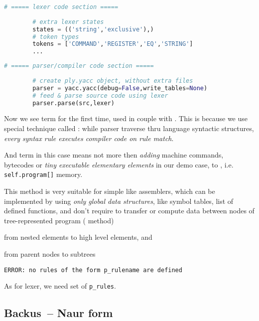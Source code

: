 \begin{lstlisting}[language=python]
		# ===== lexer code section =====
		
		# extra lexer states
		states = (('string','exclusive'),)
		# token types
		tokens = ['COMMAND','REGISTER','EQ','STRING']
		...
\end{lstlisting}

\begin{lstlisting}[language=python]
		# ===== parser/compiler code section =====
		
		# create ply.yacc object, without extra files
		parser = yacc.yacc(debug=False,write_tables=None)
		# feed & parse source code using lexer
		parser.parse(src,lexer)				
\end{lstlisting}

Now we see term  for the first time, used in couple with
. This is because we use special technique called
: while parser traverse thru language
syntactic structures, \emph{every syntax rule executes compiler code on rule
match}.

And  term in this case means not more then \emph{adding} machine
commands, bytecodes or \emph{tiny executable elementary elements} in our demo
case, to , i.e. \verb|self.program[]| memory.

\bigskip
This method is very suitable for simple  like assemblers, which
can be implemented by using \emph{only global data structures}, like symbol
tables, list of defined functions, and don't require to transfer or compute data
between nodes of tree-represented program ( method)
\begin{description}[nosep]
  \item[synthesized attributes] from nested elements to high level elements, and
  \item[inherited attributes] from parent nodes to subtrees
\end{description}

\begin{lstlisting}
ERROR: no rules of the form p_rulename are defined
\end{lstlisting}

As for lexer, we need set of \verb|p_rules|.

\subsection{Backus\ -- Naur form}

